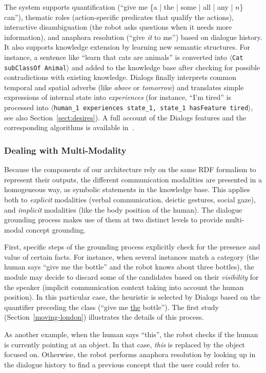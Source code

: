 \documentclass[preprint,3p,times]{elsarticle}
\newcommand{\stmt}[1]{{\footnotesize\tt$\langle$#1\relax$\rangle$}}
\begin{document}
The system supports quantification (``give me \{a | the | some | all | any |
$n$\} can''), thematic roles (action-specific predicates that qualify the
actions), interactive disambiguation (the robot asks questions when it needs
more information), and anaphora resolution (``give \emph{it} to me'') based on
dialogue history. It also supports knowledge extension by learning new semantic
structures. For instance, a sentence like ``learn that cats are animals'' is
converted into \stmt{Cat subClassOf Animal} and added to the knowledge base
after checking for possible contradictions with existing knowledge. {\sc
Dialogs} finally interprets common temporal and spatial adverbs (like
\emph{above} or \emph{tomorrow}) and translates simple expressions of internal
state  into \emph{experiences} (for instance, ``I'm tired'' is processed into
\stmt{human\_1 experiences state\_1, state\_1 hasFeature tired}, see also
Section~\ref{sect:desires}). A full account of the {\sc Dialogs} features and
the corresponding algorithms is available in~\cite{Lemaignan2011a}.

\subsubsection{Dealing with Multi-Modality}

Because the components of our architecture rely on the same RDF formalism to
represent their outputs, the different communication modalities are presented in
a homogeneous way, as symbolic statements in the knowledge base. This applies
both to \emph{explicit} modalities (verbal communication, deictic gestures,
social gaze), and \emph{implicit} modalities (like the body position of the
human). The dialogue grounding process makes use of them at two distinct levels
to provide multi-modal concept grounding.

First, specific steps of the grounding process explicitly check for the presence
and value of certain facts. For instance, when several instances match a
category (the human says ``give me the bottle'' and the robot knows about three
bottles), the module may decide to discard some of the candidates based on their
\emph{visibility} for the speaker (implicit communication context taking into
account the human position). In this particular case, the heuristic is selected
by {\sc Dialogs} based on the quantifier preceding the class (``give me
\underline{the} bottle''). The first study (Section~\ref{moving-london})
illustrates the details of this process.

As another example, when the human says ``this'', the robot checks if the human
is currently pointing at an object. In that case, \emph{this} is replaced by the
object focused on. Otherwise, the robot performs anaphora resolution by looking
up in the dialogue history to find a previous concept that the user could refer
to.
\end{document}
